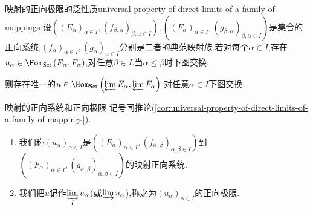 \begin{corollary}{映射的正向极限的泛性质}{universal-property-of-direct-limits-of-a-family-of-mappings}
	设$\left(\left(E_{\alpha}\right)_{\alpha\in I},\left(f_{\beta,\alpha}\right)_{\beta,\alpha\in I}\right),\left(\left(F_{\alpha}\right)_{\alpha\in I},\left(g_{\beta,\alpha}\right)_{\beta,\alpha\in I}\right)$是集合的正向系统,$\left(f_{\alpha}\right)_{\alpha\in I},\left(g_{\alpha}\right)_{\alpha\in I}$分别是二者的典范映射族.若对每个$\alpha\in I$,存在$u_{\alpha}\in\Hom_{\mathsf{Set}}\left(E_{\alpha},F_{\alpha}\right)$,对任意$\beta\in I$,当$\alpha\leq\beta$时下图交换:
	\begin{center}
	\end{center}
	则存在唯一的$u\in\Hom_{\mathsf{Set}}\left(\varprojlim E_{\alpha},\varprojlim F_{\alpha}\right)$,对任意$\alpha\in I$下图交换:
	\begin{center}
	\end{center}
\end{corollary}

\begin{definition}{映射的正向系统和正向极限}{}
	记号同推论(\cref{cor:universal-property-of-direct-limits-of-a-family-of-mappings}).
	\begin{enumerate}
		\item 我们称$\left(u_{\alpha}\right)_{\alpha\in I}$是$\left(\left(E_{\alpha}\right)_{\alpha\in I},\left(f_{\alpha,\beta}\right)_{\alpha,\beta\in I}\right)$到$\left(\left(F_{\alpha}\right)_{\alpha\in I},\left(g_{\alpha,\beta}\right)_{\alpha,\beta\in I}\right)$的映射正向系统.
		\item 我们把$u$记作$\varinjlim\limits_{I}u_{\alpha}$(或$\varinjlim u_{\alpha}$),称之为$\left(u_{\alpha}\right)_{\alpha\in I}$的正向极限.
	\end{enumerate}
\end{definition}

